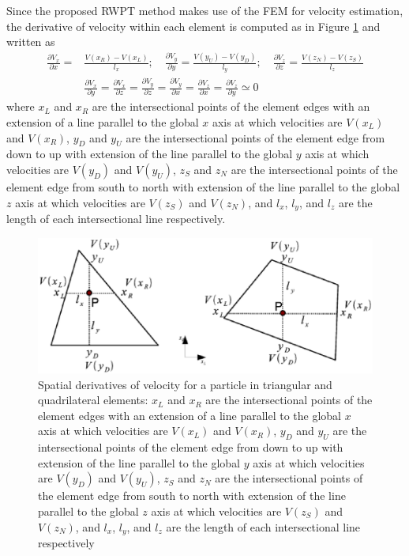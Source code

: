 Since the proposed RWPT method makes use of the FEM for velocity estimation, the derivative of velocity within each element is computed as in Figure \ref{DerivativeVelocity} and written as
\begin{equation}\label{DerivativeVelocityNotZero}
\begin{array}{ll}
\frac {\partial V _x}{\partial x} = & \frac {V(x_R) - V(x_L)}{l _x}; \quad
\frac {\partial V _y}{\partial y} = \frac {V(y _U) - V(y _D)}{l _y}; \quad
\frac {\partial V _z}{\partial z} = \frac {V(z _N) - V(z _S)}{l _z} \\
& \frac {\partial V _x}{\partial y} = \frac {\partial V _x}{\partial z} =
\frac {\partial V _y}{\partial z} = \frac {\partial V _y}{\partial x} =
\frac {\partial V _z}{\partial x} = \frac {\partial V _z}{\partial y}
\simeq 0
\end{array}
\end{equation}
where $x _L$ and $x _R$ are the intersectional points of the element edges with an extension of a  line parallel to the global $x$ axis at which velocities are $V(x _L)$ and $V(x _R)$, $y _D$ and $y _U$ are the intersectional points of the element edge from down to up with extension of the line parallel to the global $y$ axis at which velocities are $V(y _D)$ and $V(y _U)$, $z _S$ and $z _N$ are the intersectional points of the element edge from south to north with extension of the line parallel to the global $z$ axis at which velocities are $V(z _S)$ and $V(z _N)$, and $l _x$, $l _y$, and $l _z$ are the length of each intersectional line respectively.

\begin{figure}[H]
\centering
\includegraphics[scale=0.60]{RWPT/figures/DerivativeScheme.eps}
\caption{Spatial derivatives of velocity for a particle in triangular and quadrilateral elements: $x _L$ and $x _R$ are the intersectional points of the element edges with an extension of a  line parallel to the global $x$ axis at which velocities are $V(x _L)$ and $V(x _R)$, $y _D$ and $y _U$ are the intersectional points of the element edge from down to up with extension of the line parallel to the global $y$ axis at which velocities are $V(y _D)$ and $V(y _U)$, $z _S$ and $z _N$ are the intersectional points of the element edge from south to north with extension of the line parallel to the global $z$ axis at which velocities are $V(z _S)$ and $V(z _N)$, and $l _x$, $l _y$, and $l _z$ are the length of each intersectional line respectively}
\label{DerivativeVelocity}
\end{figure}


